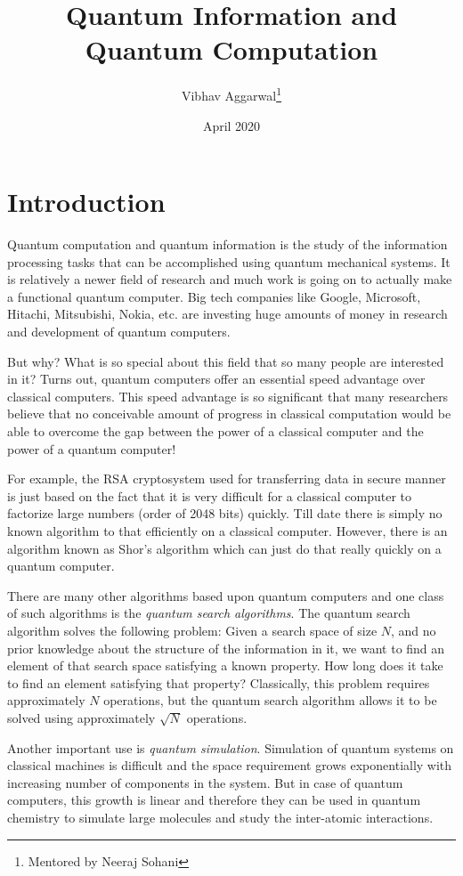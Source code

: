\documentclass[12pts, letterpaper]{article}
\title{Quantum Information and Quantum Computation}
\author{Vibhav Aggarwal\thanks{Mentored by Neeraj Sohani}}
\date{April 2020}
\numberwithin{equation}{section}
\theoremstyle{definition}
\numberwithin{definition}{section}
\numberwithin{theorem}{section}
\theoremstyle{remark}
\numberwithin{exercise}{section}
\begin{document}
\maketitle

\tableofcontents
\newpage
\section{Introduction}

Quantum computation and quantum information is the study of the information processing tasks that can be accomplished using quantum mechanical systems. It is relatively a newer field of research and much work is going on to actually make a functional quantum computer. Big tech companies like Google, Microsoft, Hitachi, Mitsubishi, Nokia, etc. are investing huge amounts of money in research and development of quantum computers.
\vspace{1em}

But why? What is so special about this field that so many people are interested in it? Turns out, quantum computers offer an essential speed advantage over classical computers. This speed advantage is so significant that many researchers believe that no conceivable amount of progress in classical computation would be able to overcome the gap between the power of a classical computer and the power of a quantum computer!
\vspace{1em}

For example, the RSA cryptosystem used for transferring data in secure manner is just based on the fact that it is very difficult for a classical computer to factorize large numbers (order of 2048 bits) quickly. Till date there is simply no known algorithm to that efficiently on a classical computer. However, there is an algorithm known as Shor’s algorithm which can just do that really quickly on a quantum computer.
\vspace{1em}

There are many other algorithms based upon quantum computers and one class of such algorithms is the \textit{quantum search algorithms}. The quantum search algorithm solves
the following problem: Given a search space of size $N$, and no prior knowledge about the
structure of the information in it, we want to find an element of that search space satisfying a known property. How long does it take to find an element satisfying that property?
Classically, this problem requires approximately $N$ operations, but the quantum search algorithm allows it to be solved using approximately $\sqrt{N}$ operations.
\vspace{1em}

Another important use is \textit{quantum simulation}. Simulation of quantum systems on classical machines is difficult and the space requirement grows exponentially with increasing number of components in the system. But in case of quantum computers, this growth is linear and therefore they can be used in quantum chemistry to simulate large molecules and study the inter-atomic interactions.

\newpage

\newpage

% 
\end{document}
